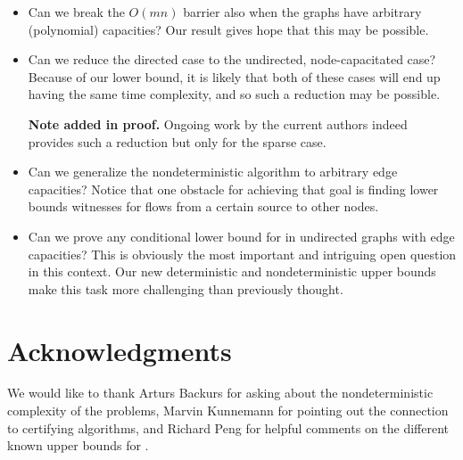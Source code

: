 \begin{itemize}
\item Can we break the $O(mn)$ barrier also when the graphs have arbitrary (polynomial) capacities? Our result gives hope that this may be possible.

\item Can we reduce the directed case to the undirected, node-capacitated case? Because of our lower bound, it is likely that both of these cases will end up having the same time complexity, and so such a reduction may be possible.

\smallskip
\textbf{Note added in proof.}
Ongoing work by the current authors indeed provides such a reduction but only for the sparse case.
%

\item Can we generalize the nondeterministic algorithm to arbitrary edge capacities? Notice that one obstacle for achieving that goal is finding lower bounds witnesses for flows from a certain source to other nodes.

\item Can we prove any conditional lower bound for \APMF in undirected graphs with edge capacities? This is obviously the most important and intriguing open question in this context. Our new deterministic and nondeterministic upper bounds make this task more challenging than previously thought.
\end{itemize}

%
\section{Acknowledgments}   %
We would like to thank Arturs Backurs for asking about the nondeterministic complexity of the problems, Marvin Kunnemann for pointing out the connection to certifying algorithms, and Richard Peng for helpful comments on the different known upper bounds for \MF.


